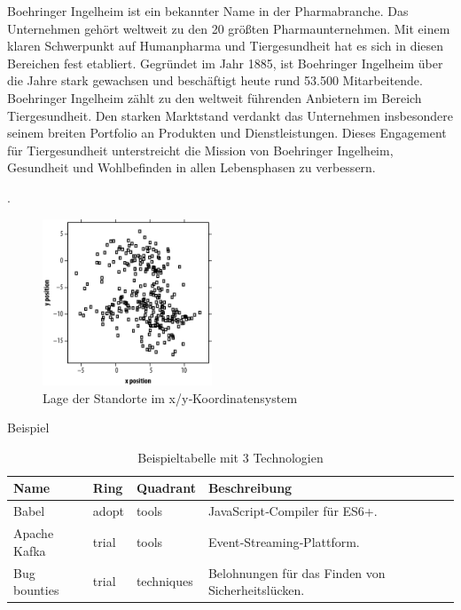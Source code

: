 Boehringer Ingelheim ist ein bekannter Name in der Pharmabranche. Das Unternehmen gehört weltweit zu den 20 größten Pharmaunternehmen. Mit einem klaren Schwerpunkt auf Humanpharma und Tiergesundheit hat es sich in diesen Bereichen fest etabliert.
Gegründet im Jahr 1885, ist Boehringer Ingelheim über die Jahre stark gewachsen und beschäftigt heute rund 53.500 Mitarbeitende.
Boehringer Ingelheim zählt zu den weltweit führenden Anbietern im Bereich Tiergesundheit. Den starken Marktstand verdankt das Unternehmen insbesondere seinem breiten Portfolio an Produkten und Dienstleistungen. Dieses Engagement für Tiergesundheit unterstreicht die Mission von Boehringer Ingelheim, Gesundheit und Wohlbefinden in allen Lebensphasen zu verbessern.

\citep{boehringerProfile2024}.
\begin{figure}[H]
    \centering
    \includegraphics[width=0.45\textwidth]{Abbildungen/01_example_image.png}
    \caption{Lage der Standorte im x/y‑Koordinatensystem}
    \label{fig:figure1}
\end{figure}
Beispiel
\begin{table}[H]
    \centering
    \begin{tabular}{|l|l|l|p{5cm}|}
        \hline
        \textbf{Name} & \textbf{Ring} & \textbf{Quadrant} & \textbf{Beschreibung}          \\
        \hline
        Babel         & adopt         & tools             & JavaScript‑Compiler für ES6+. \\
        \hline
        Apache Kafka  & trial         & tools             & Event‑Streaming‑Plattform.     \\
        \hline
        Bug bounties  & trial         & techniques        & Belohnungen für das Finden von Sicherheitslücken.     \\
        \hline
    \end{tabular}
    \caption{Beispieltabelle mit 3 Technologien}
    \label{tab:my_label}
\end{table}